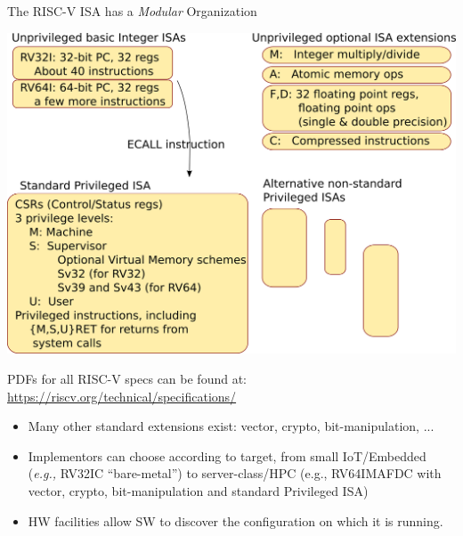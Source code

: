 \documentclass{article}
\newcommand{\eg}{\emph{e.g.,}}
\begin{document}
\begin{center}
{\Huge
  The RISC-V ISA has a \emph{Modular} Organization}

\vspace*{0.3in}

{\includegraphics[scale=0.7]{Figs/ISA_Modularity.png}}

PDFs for all RISC-V specs can be found at: \url{https://riscv.org/technical/specifications/}

\begin{itemize}\LARGE

\item Many other standard extensions exist: vector, crypto, bit-manipulation, ...

\item Implementors can choose according to target, from small
  IoT/Embedded ({\eg} RV32IC ``bare-metal'') to server-class/HPC (e.g.,
  RV64IMAFDC with vector, crypto, bit-manipulation and standard
  Privileged ISA)

\item HW facilities allow SW to discover the configuration on which it is running.

\end{itemize}

\end{center}

\clearpage

\end{document}
